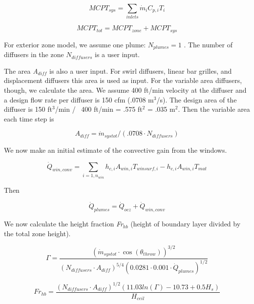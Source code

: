 \begin{equation}
MCP{T_{sys}} = \sum\limits_{inlets} {{{\dot m}_i}} {C_{p,i}}{T_i}
\end{equation}

\begin{equation}
MCP{T_{tot}} = MCP{T_{zone}} + MCP{T_{sys}}
\end{equation}

For exterior zone model, we assume one plume: \({N_{plumes}} = 1\) . The number of diffusers in the zone \({N_{diffusers}}\) is a user input.

The area \emph{A\(_{diff}\)} is also a user input. For swirl diffusers, linear bar grilles, and displacement diffusers this area is used as input. For the variable area diffusers, though, we calculate the area. We assume 400 ft/min velocity at the diffuser and a design flow rate per diffuser is 150 cfm (.0708 m\(^{3}\)/s). The design area of the diffuser is 150 ft\(^{3}\)/min /~ 400 ft/min = .575 ft\(^{2}\) = .035 m\(^{2}\). Then the variable area each time step is

\begin{equation}
{A_{diff}} = {\dot m_{systot}}/(.0708\cdot {N_{diffusers}})
\end{equation}

We now make an initial estimate of the convective gain from the windows.

\begin{equation}
{\dot Q_{win,conv}} = \sum\limits_{i = 1,{n_{win}}} {{h_{c,i}}} {A_{win,i}}{T_{winsurf,i}} - {h_{c,i}}{A_{win,i}}{T_{mat}}
\end{equation}

Then

\begin{equation}
{\dot Q_{plumes}} = {\dot Q_{ocz}} + {\dot Q_{win,conv}}
\end{equation}

We now calculate the height fraction \emph{Fr\(_{hb}\)} (height of boundary layer divided by the total zone height).

\begin{equation}
\Gamma  = \frac{{{{({{\dot m}_{systot}}\cdot \cos ({\theta_{throw}}))}^{3/2}}}}{{{{({N_{diffusers}}\cdot {A_{diff}})}^{5/4}}{{(0.0281\cdot 0.001\cdot {{\dot Q}_{plumes}})}^{1/2}}}}
\end{equation}

\begin{equation}
F{r_{hb}} = \frac{{{{({N_{diffusers}}\cdot {A_{diff}})}^{1/2}}(11.03ln(\Gamma ) - 10.73 + 0.5{H_s})}}{{{H_{ceil}}}}
\end{equation}


